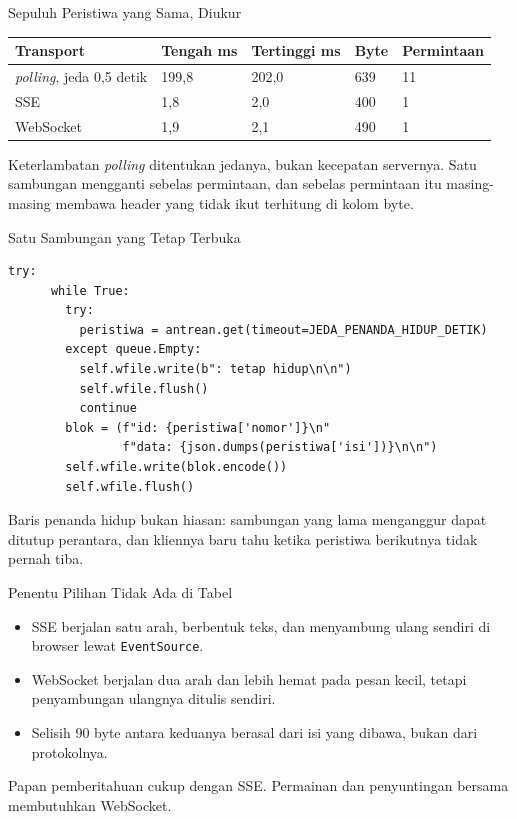 \documentclass[aspectratio=169, table, 12pt]{beamer}
\begin{document}
\begin{frame}{{\Large Sepuluh Peristiwa yang Sama, Diukur}}
  \vspace{6pt}
  \centering
  {\footnotesize
  \begin{tabularx}{\textwidth}{Yllll}
    \hline
    \textbf{Transport} & \textbf{Tengah ms} & \textbf{Tertinggi ms} & \textbf{Byte} & \textbf{Permintaan} \\
    \hline
    \textit{polling}, jeda 0,5 detik & 199,8 & 202,0 & 639 & 11 \\
    \hline
    SSE & 1,8 & 2,0 & 400 & 1 \\
    \hline
    WebSocket & 1,9 & 2,1 & 490 & 1 \\
    \hline
  \end{tabularx}}

  \vspace{6pt}
  {\small Keterlambatan \textit{polling} ditentukan jedanya, bukan kecepatan
  servernya. Satu sambungan mengganti sebelas permintaan, dan sebelas
  permintaan itu masing-masing membawa header yang tidak ikut terhitung di
  kolom byte.}
\end{frame}

\begin{frame}[fragile]{{\Large Satu Sambungan yang Tetap Terbuka}}
  \vspace{2pt}
\begin{lstlisting}[style=PythonStyle]
    try:
      while True:
        try:
          peristiwa = antrean.get(timeout=JEDA_PENANDA_HIDUP_DETIK)
        except queue.Empty:
          self.wfile.write(b": tetap hidup\n\n")
          self.wfile.flush()
          continue
        blok = (f"id: {peristiwa['nomor']}\n"
                f"data: {json.dumps(peristiwa['isi'])}\n\n")
        self.wfile.write(blok.encode())
        self.wfile.flush()
\end{lstlisting}
  \vspace{2pt}
  {\small Baris penanda hidup bukan hiasan: sambungan yang lama menganggur
  dapat ditutup perantara, dan kliennya baru tahu ketika peristiwa
  berikutnya tidak pernah tiba.}
\end{frame}

\begin{frame}{{\Large Penentu Pilihan Tidak Ada di Tabel}}
  \vspace{12pt}
  \begin{itemize}
    \item SSE berjalan satu arah, berbentuk teks, dan menyambung ulang
          sendiri di browser lewat \texttt{EventSource}.
    \item WebSocket berjalan dua arah dan lebih hemat pada pesan kecil,
          tetapi penyambungan ulangnya ditulis sendiri.
    \item Selisih 90 byte antara keduanya berasal dari isi yang dibawa, bukan
          dari protokolnya.
  \end{itemize}
  \vspace{10pt}
  {\small Papan pemberitahuan cukup dengan SSE. Permainan dan penyuntingan
  bersama membutuhkan WebSocket.}
\end{frame}
\end{document}
